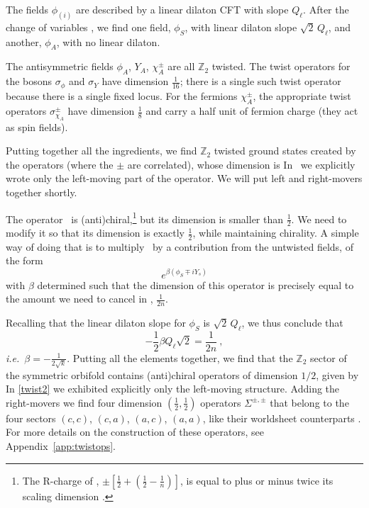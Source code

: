 \documentclass[12pt]{article}
\def\ie{{i.e.}}
\def\half{\frac12}
\newcommand{\bZ}{{\mathbb Z}}
\numberwithin{equation}{section}
\def\ie{{\it i.e.}}
\def\sst{\scriptscriptstyle}
\def\half{\frac12}
\def\exp{{\rm exp}}
\def\ie{{\it i.e.}}
\def\LG{{\sst\bf LG}}
\begin{document}
The fields $\phi_{(i)}$ are described by a linear dilaton CFT with slope $Q_\ell$. After the change of variables \SAfields, we find one field, $\phi_S$, with linear dilaton slope $\sqrt2\,Q_\ell$, and another, $\phi_A$, with no linear dilaton.

The antisymmetric fields $\phi_A$, $Y_A$, $\chi^\pm_A$ are all $\bZ_2$ twisted. The twist operators for the bosons $\sigma^{~}_\phi$ and $\sigma^{~}_Y$ have dimension $\frac{1}{16}$; there is a single such twist operator because there is a single fixed locus. 
For the fermions $\chi^\pm_A$, the appropriate twist operators 
$\sigma^{\pm}_{\chi_A^{~}}$
have dimension $\frac18$ and carry a half unit of fermion charge (they act as spin fields).


Putting together all the ingredients, we find $\bZ_2$ twisted ground states created by the operators 
\eqn[justtwist]{\sigma_{\phi^{~}_A} \sigma^{~}_{Y_A} \sigma^{\pm}_{\chi_A}\Sigma^\pm_{\LG}}
(where the $\pm$ are correlated), whose dimension is 
In \justtwist\ we explicitly wrote only the left-moving part of the operator. We will put left and right-movers together shortly.

The operator \justtwist\ is (anti)chiral,\footnote{The R-charge of \justtwist, $\pm\left[\half+\left(\half-\frac1n\right)\right]$, is equal to plus or minus twice its scaling dimension \excess.}   
but its dimension is smaller than $\half$. We need to modify it so that its dimension is exactly $\half$, while maintaining chirality.  
A simple way of doing that is to multiply \justtwist\ by a contribution from the untwisted fields, of the form 
$$e^{\beta(\phi_S\mp i Y_s)}$$
with $\beta$ determined such that the dimension of this operator is precisely equal to the amount we need to cancel in \excess, $\frac{1}{2n}$. 

Recalling that the linear dilaton slope for $\phi_S$ is $\sqrt2\,Q_\ell$, we thus conclude that 
$$-\half\beta Q_\ell\sqrt2=\frac{1}{2n}~,$$
\ie\ $\beta=-\frac{1}{2\sqrt k}$. 
Putting all the elements together, we find that the $\bZ_2$ sector of the symmetric orbifold contains (anti)chiral operators of dimension $1/2$, given by
\eqn[twist2]{
\Sigma^\pm = \Sigma^\pm_{\rm free}\,\Sigma^\pm_\LG = \exp\Big[ -\frac{1}{2\sqrt{k}}\big( \phi_S \mp iY_S\big) \Big]\,
\big( \sigma_{\phi^{~}_A} \sigma^{~}_{Y_A} \sigma^{\pm}_{\chi_A} \big) \, \Sigma^\pm_{\LG}  ~.
}
In \eqref{twist2} we exhibited explicitly only the left-moving structure. Adding the right-movers we find four dimension $(\half,\half)$ operators $\Sigma^{\pm,\pm}$ that belong to the four sectors $(c,c)$, $(c,a)$, $(a,c)$, $(a,a)$, like their worldsheet counterparts \SSbar.  For more details on the construction of these operators, see Appendix~\ref{app:twistops}.
\end{document}
